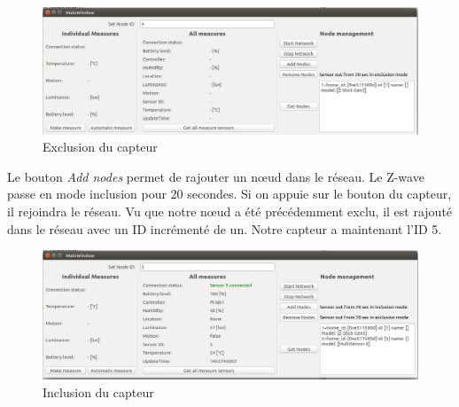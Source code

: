 \begin{figure}[H]
	\begin{center}
		\includegraphics[width=16cm]{img/api6.png}
		\caption{Exclusion du capteur}
		\label{api6}
	\end{center}
\end{figure} 
Le bouton \textit{Add nodes} permet de rajouter un nœud dans le réseau. Le Z-wave passe en mode inclusion pour 20 secondes. Si on appuie sur le bouton du capteur, il rejoindra le réseau. Vu que notre nœud a été précédemment exclu, il est rajouté dans le réseau avec un ID incrémenté de un. Notre capteur a maintenant l'ID 5.
\begin{figure}[H]
	\begin{center}
		\includegraphics[width=16cm]{img/api7.png}
		\caption{Inclusion du capteur}
		\label{api7}
	\end{center}
\end{figure}